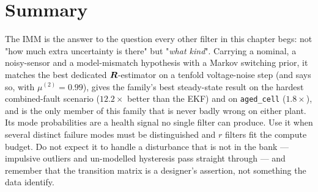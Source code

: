 \section{Summary}
The IMM is the answer to the question every other filter in this chapter begs: not "how much extra
uncertainty is there" but "\emph{what kind}".  Carrying a nominal, a noisy-sensor and a
model-mismatch hypothesis with a Markov switching prior, it matches the best dedicated
$\bm{R}$-estimator on a tenfold voltage-noise step (and says so, with $\mu^{(2)}=0.99$), gives the
family's best steady-state result on the hardest combined-fault scenario ($12.2\times$ better than
the EKF) and on \texttt{aged\_cell} ($1.8\times$), and is the only member of this family that is
never badly wrong on either plant.  Its mode
probabilities are a health signal no single filter can produce.  Use it when several distinct
failure modes must be distinguished and $r$ filters fit the compute budget.  Do not expect it to
handle a disturbance that is not in the bank --- impulsive outliers and un-modelled hysteresis pass
straight through --- and remember that the transition matrix is a designer's assertion, not
something the data identify.
